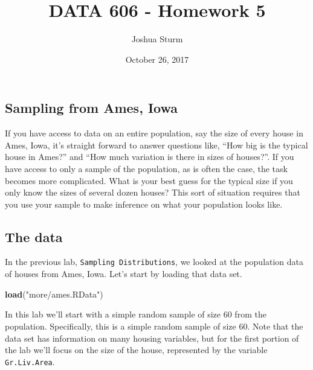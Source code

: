 \documentclass[]{article}
\title{DATA 606 - Homework 5}
\author{Joshua Sturm}
\date{October 26, 2017}
\newenvironment{Shaded}{\begin{snugshade}}{\end{snugshade}}
\newcommand{\KeywordTok}[1]{\textcolor[rgb]{0.13,0.29,0.53}{\textbf{#1}}}
\newcommand{\DecValTok}[1]{\textcolor[rgb]{0.00,0.00,0.81}{#1}}
\newcommand{\StringTok}[1]{\textcolor[rgb]{0.31,0.60,0.02}{#1}}
\newcommand{\CommentTok}[1]{\textcolor[rgb]{0.56,0.35,0.01}{\textit{#1}}}
\newcommand{\OperatorTok}[1]{\textcolor[rgb]{0.81,0.36,0.00}{\textbf{#1}}}
\newcommand{\NormalTok}[1]{#1}
\begin{document}
\maketitle

\subsection{Sampling from Ames, Iowa}\label{sampling-from-ames-iowa}

If you have access to data on an entire population, say the size of
every house in Ames, Iowa, it's straight forward to answer questions
like, ``How big is the typical house in Ames?'' and ``How much variation
is there in sizes of houses?''. If you have access to only a sample of
the population, as is often the case, the task becomes more complicated.
What is your best guess for the typical size if you only know the sizes
of several dozen houses? This sort of situation requires that you use
your sample to make inference on what your population looks like.

\subsection{The data}\label{the-data}

In the previous lab, \texttt{Sampling\ Distributions}, we looked at the
population data of houses from Ames, Iowa. Let's start by loading that
data set.

\begin{Shaded}
\begin{Highlighting}[]
\KeywordTok{load}\NormalTok{(}\StringTok{"more/ames.RData"}\NormalTok{)}
\end{Highlighting}
\end{Shaded}

In this lab we'll start with a simple random sample of size 60 from the
population. Specifically, this is a simple random sample of size 60.
Note that the data set has information on many housing variables, but
for the first portion of the lab we'll focus on the size of the house,
represented by the variable \texttt{Gr.Liv.Area}.

\begin{Shaded}
\end{Shaded}
\end{document}
